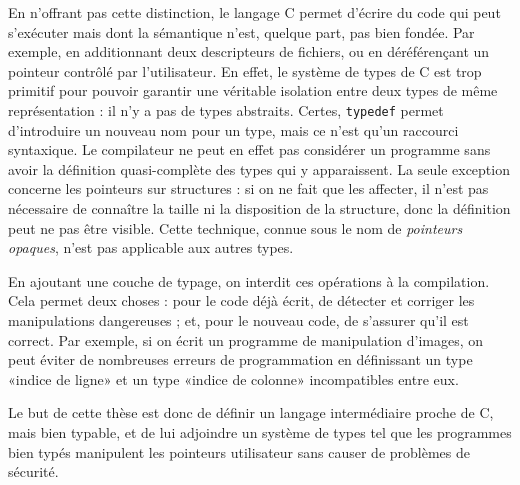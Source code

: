 En n'offrant pas cette distinction, le langage C permet d'écrire du code qui
peut s'exécuter mais dont la sémantique n'est, quelque part, pas bien fondée.
Par exemple, en additionnant deux descripteurs de fichiers, ou en déréférençant
un pointeur contrôlé par l'utilisateur. En effet, le système de types de C est
trop primitif pour pouvoir garantir une véritable isolation entre deux types de
même représentation : il n'y a pas de types abstraits. Certes, \texttt{typedef}
permet d'introduire un nouveau nom pour un type, mais ce n'est qu'un raccourci
syntaxique. Le compilateur ne peut en effet pas considérer un programme sans
avoir la définition quasi-complète des types qui y apparaissent. La seule
exception concerne les pointeurs sur structures : si on ne fait que les
affecter, il n'est pas nécessaire de connaître la taille ni la disposition de la
structure, donc la définition peut ne pas être visible. Cette technique, connue
sous le nom de \emph{pointeurs opaques}, n'est pas applicable aux autres types.

En ajoutant une couche de typage, on interdit ces opérations à la compilation.
Cela permet deux choses : pour le code déjà écrit, de détecter et corriger les
manipulations dangereuses ; et, pour le nouveau code, de s'assurer qu'il est
correct. Par exemple, si on écrit un programme de manipulation d'images, on peut
éviter de nombreuses erreurs de programmation en définissant un type «indice de
ligne» et un type «indice de colonne» incompatibles entre eux.

Le but de cette thèse est donc de définir un langage intermédiaire proche de C,
mais bien typable, et de lui adjoindre un système de types tel que les
programmes bien typés manipulent les pointeurs utilisateur sans causer de
problèmes de sécurité.

